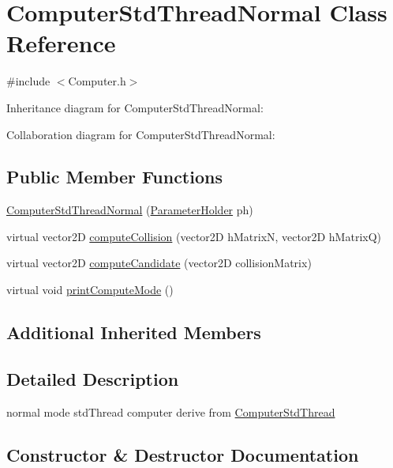\hypertarget{classComputerStdThreadNormal}{}\section{Computer\+Std\+Thread\+Normal Class Reference}
\label{classComputerStdThreadNormal}


{\ttfamily \#include $<$Computer.\+h$>$}



Inheritance diagram for Computer\+Std\+Thread\+Normal\+:


Collaboration diagram for Computer\+Std\+Thread\+Normal\+:
\subsection*{Public Member Functions}
\begin{DoxyCompactItemize}
\item 
\hyperlink{classComputerStdThreadNormal_ab6a1d901e6dcd9ae494b0778988d8a41}{Computer\+Std\+Thread\+Normal} (\hyperlink{structParameterHolder}{Parameter\+Holder} ph)
\item 
virtual vector2D \hyperlink{classComputerStdThreadNormal_a3a8e3f664b816e67d5dc914dfd1173a1}{compute\+Collision} (vector2D h\+MatrixN, vector2D h\+MatrixQ)
\item 
virtual vector2D \hyperlink{classComputerStdThreadNormal_a65ab335a7f8ff1f4824ae81d3e5faf81}{compute\+Candidate} (vector2D collision\+Matrix)
\item 
virtual void \hyperlink{classComputerStdThreadNormal_a969e9d0a9db4a7c50d85082e112eb43f}{print\+Compute\+Mode} ()
\end{DoxyCompactItemize}
\subsection*{Additional Inherited Members}


\subsection{Detailed Description}
normal mode std\+Thread computer derive from \hyperlink{classComputerStdThread}{Computer\+Std\+Thread} 

\subsection{Constructor \& Destructor Documentation}
